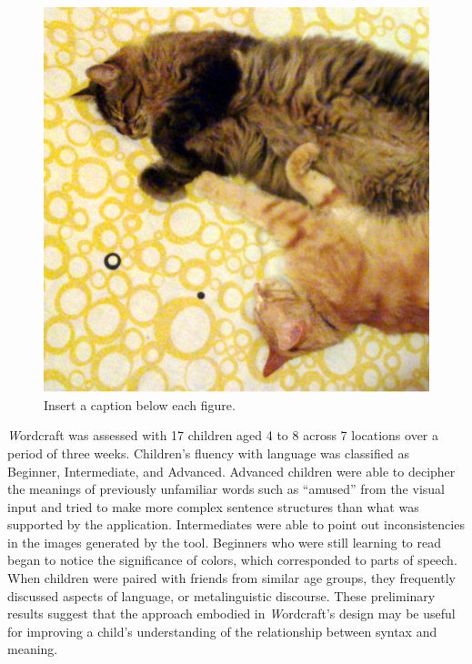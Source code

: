 \documentclass{sigchi-ext}
\begin{document}
\begin{figure}
  \centering
  \includegraphics[width=0.7\columnwidth]{figures/cats.png}
  \caption{Insert a caption below each figure.}
  \label{fig:figure1}
\end{figure}


\emph Wordcraft was assessed with 17 children aged 4 to 8 across 7 locations over a period of three weeks.  Children’s fluency with language was classified as Beginner, Intermediate, and Advanced.  Advanced children were able to decipher the meanings of previously unfamiliar words such as ``amused'' from the visual input and tried to make more complex sentence structures than what was supported by the application.  Intermediates were able to point out inconsistencies in the images generated by the tool. Beginners who were still learning to read began to notice the significance of colors, which corresponded to parts of speech.  When children were paired with friends from similar age groups, they frequently discussed aspects of language, or metalinguistic discourse. These preliminary results suggest that the approach embodied in \emph Wordcraft’s design may be useful for improving a child's understanding of the relationship between syntax and meaning.
\end{document}
